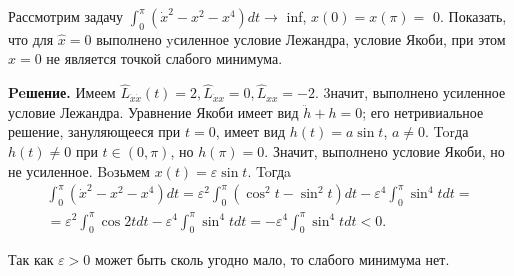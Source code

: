 \begin{task}
    Рассмотрим задачу $\int_0^\pi\left(\dot{x}^2-x^2-x^4\right) d t \rightarrow$ inf, $x(0)=x(\pi)=$ 0.
    Показать, что для $\hat{x}=0$ выполнено yсиленное условие Лежандра, условие Якоби,
    при этом $\hat{x}=0$ не является точкой слабого минимума.

    \textbf{Peшение.} Имеем $\hat{L}_{\dot{x} \dot{x}}(t)=2, \hat{L}_{\dot{x} x}=0, \hat{L}_{x x}=-2$. 3начит, выполнено усиленное условие Лежандра. Уравнение Якоби имеет вид $\ddot{h}+h=0$; его нетривиальное решение, зануляющееся при $t=0$, имеет вид $h(t)=a \sin t$, $a \neq 0$. Torда $h(t) \neq 0$ при $t \in(0, \pi)$, но $h(\pi)=0$. Значит, выполнено условие Якоби, но не усиленное.
    Boзьмем $x(t)=\varepsilon \sin t$. Toгдa
    $$
        \begin{gathered}
            \int_0^\pi\left(\dot{x}^2-x^2-x^4\right) d t=\varepsilon^2 \int_0^\pi\left(\cos ^2 t-\sin ^2 t\right) d t-\varepsilon^4 \int_0^\pi \sin ^4 t d t= \\
            =\varepsilon^2 \int_0^\pi \cos 2 t d t-\varepsilon^4 \int_0^\pi \sin ^4 t d t=-\varepsilon^4 \int_0^\pi \sin ^4 t d t<0 .
        \end{gathered}
    $$

    Так как $\varepsilon>0$ может быть сколь угодно мало, то слабого минимума нет.
\end{task}